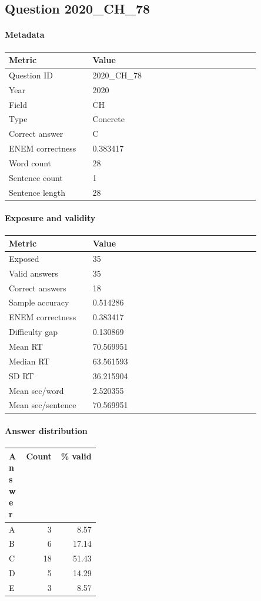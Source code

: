 \subsection*{Question 2020\_CH\_78}
\label{sec:q_2020_CH_78}
\paragraph{Metadata}
\begin{tabular}{p{0.30\linewidth}p{0.60\linewidth}}
\toprule
Metric & Value\\
\midrule
Question ID & 2020\_CH\_78\\
Year & 2020\\
Field & CH\\
Type & Concrete\\
Correct answer & C\\
ENEM correctness & 0.383417\\
Word count & 28\\
Sentence count & 1\\
Sentence length & 28\\
\bottomrule
\end{tabular}

\paragraph{Exposure and validity}
\begin{tabular}{p{0.30\linewidth}p{0.60\linewidth}}
\toprule
Metric & Value\\
\midrule
Exposed & 35\\
Valid answers & 35\\
Correct answers & 18\\
Sample accuracy & 0.514286\\
ENEM correctness & 0.383417\\
Difficulty gap & 0.130869\\
Mean RT & 70.569951\\
Median RT & 63.561593\\
SD RT & 36.215904\\
Mean sec/word & 2.520355\\
Mean sec/sentence & 70.569951\\
\bottomrule
\end{tabular}

\paragraph{Answer distribution}
\begin{tabular}{p{0.18\linewidth}rr}
\toprule
Answer & Count & \% valid\\
\midrule
A & 3 & 8.57\\
B & 6 & 17.14\\
C & 18 & 51.43\\
D & 5 & 14.29\\
E & 3 & 8.57\\
\bottomrule
\end{tabular}

